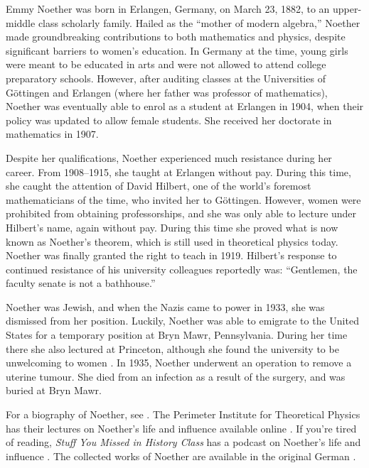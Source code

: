\documentclass[../../../include/open-logic-section]{subfiles}
\begin{document}



Emmy Noether was born in Erlangen, Germany, on March 23, 1882, to an
upper-middle class scholarly family. Hailed as the ``mother of modern
algebra,'' Noether made groundbreaking contributions to both
mathematics and physics, despite significant barriers to women's
education. In Germany at the time, young girls were meant to be
educated in arts and were not allowed to attend college preparatory
schools.  However, after auditing classes at the Universities of
G\"{o}ttingen and Erlangen (where her father was professor of
mathematics), Noether was eventually able to enrol as a student at
Erlangen in 1904, when their policy was updated to allow female
students. She received her doctorate in mathematics in 1907.

Despite her qualifications, Noether experienced much resistance during
her career. From 1908--1915, she taught at Erlangen without
pay. During this time, she caught the attention of David Hilbert, one
of the world's foremost mathematicians of the time, who invited her to
G\"{o}ttingen. However, women were prohibited from obtaining
professorships, and she was only able to lecture under Hilbert's name,
again without pay. During this time she proved what is now known as
Noether's theorem, which is still used in theoretical physics
today. Noether was finally granted the right to teach in 1919.
Hilbert's response to continued resistance of his university
colleagues reportedly was: ``Gentlemen, the faculty senate is not a
bathhouse.''

Noether was Jewish, and when the Nazis came to power in 1933, she was
dismissed from her position. Luckily, Noether was able to emigrate to
the United States for a temporary position at Bryn Mawr,
Pennsylvania. During her time there she also lectured at Princeton,
although she found the university to be unwelcoming to women
\citep[81]{Dick1981}. In 1935, Noether underwent an operation to
remove a uterine tumour. She died from an infection as a result of the
surgery, and was buried at Bryn Mawr.

\begin{reading} 
For a biography of Noether, see \citet{Dick1981}.  The Perimeter
Institute for Theoretical Physics has their lectures on Noether's life
and influence available online \citep{Perimeter2015}.  If you're tired
of reading, \emph{Stuff You Missed in History Class} has a podcast on
Noether's life and influence \citep{Frey2015}.  The collected works of
Noether are available in the original German \citet{Noether1983}.
\end{reading}
\end{document}
